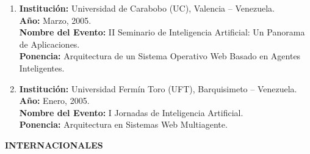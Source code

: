 \begin{enumerate}
\item \textbf{Institución:} Universidad de Carabobo (UC), Valencia – Venezuela.\\
\textbf{Año:} Marzo, 2005.\\
\textbf{Nombre del Evento:} II Seminario de Inteligencia Artificial: Un Panorama de
Aplicaciones.\\
\textbf{Ponencia:} Arquitectura de un Sistema Operativo Web Basado en Agentes
Inteligentes.

\item \textbf{Institución:} Universidad Fermín Toro (UFT), Barquisimeto – Venezuela.\\
\textbf{Año:} Enero, 2005.\\
\textbf{Nombre del Evento:} I Jornadas de Inteligencia Artificial.\\
\textbf{Ponencia:} Arquitectura en Sistemas Web Multiagente.

\end{enumerate}

\espaciotriple

\noindent\textbf{INTERNACIONALES}


